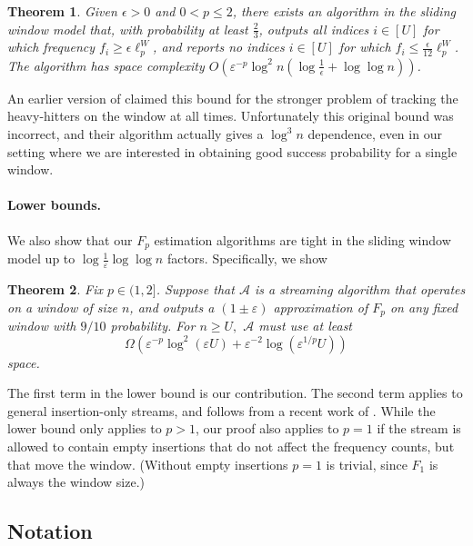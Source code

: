 \documentclass{article}
\newcommand{\eps}{\varepsilon}
\theoremstyle{plain}
\newtheorem{theorem}{Theorem}[section]
\newcommand{\unisize}{U}
\newcommand{\window}{n}
\begin{document}
\begin{theorem}\label{Heavy Hitter}
Given $\epsilon>0$ and $0 < p \leq 2$, there exists an algorithm in the sliding window model that, with probability at least $\frac{2}{3}$, outputs all indices $i \in[U]$ for which frequency $f_i \geq \epsilon \ell_p ^ W$, and reports no indices $i \in[U]$ for which $f_i \leq \frac{\epsilon}{12} \ell_p ^ W$. The algorithm has space complexity $O\left(\eps^{-p} \log ^2 n\left(\log \frac{1}{\epsilon}+\log \log n\right)\right)$.
\end{theorem}
An earlier version of \cite{braverman2018nearly} claimed this bound for the stronger problem of tracking the heavy-hitters on the window at all times.  Unfortunately this original bound was incorrect, and their algorithm actually gives a $\log^3 n$ dependence, even in our setting where we are interested in obtaining good success probability for a single window. 


\paragraph{Lower bounds.}  We also show that our $F_p$ estimation algorithms are  tight in the sliding window model up to $\log\frac{1}{\eps} \log\log n$ factors.  Specifically, we show

\begin{theorem}
Fix $p \in (1,2]$. Suppose that $\mathcal{A}$ is a streaming algorithm that operates on a window of size $\window$, and outputs a $(1\pm \eps)$ approximation of $F_p$ on any fixed window with $9/10$ probability. For $\window \geq \unisize,$ $\mathcal{A}$ must use at least \[\Omega\left(\eps^{-p}\log^2(\eps \unisize) + \eps^{-2}\log(\eps^{1/p} \unisize)\right)\] space.
\end{theorem}


The first term in the lower bound is our contribution.  The second term applies to general insertion-only streams, and follows from a recent work of \cite{braverman2024optimality}. 
While the lower bound only applies to $p>1$, our proof also applies to $p=1$ if the stream is allowed to contain empty insertions that do not affect the frequency counts, but that move the window. (Without empty insertions $p=1$ is trivial, since $F_1$ is always the window size.)


\subsection{Notation}
\end{document}
